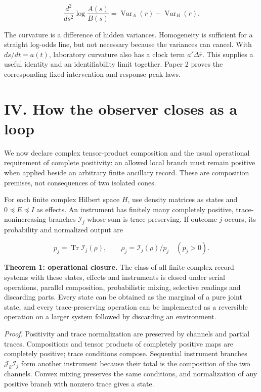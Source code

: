 \documentclass[
  11pt,
  a4paper,
]{article}
\begin{document}
\[\frac{d^2}{ds^2}\log\frac{A(s)}{B(s)}
=\operatorname{Var}_A(r)-\operatorname{Var}_B(r).\]

The curvature is a difference of hidden variances. Homogeneity is sufficient for a straight log-odds line, but not necessary because the variances can cancel. With \(ds/dt=a(t)\), laboratory curvature also has a clock term \(a'\Delta\bar r\). This supplies a useful identity and an identifiability limit together. Paper 2 proves the corresponding fixed-intervention and response-peak laws.

\section{IV. How the observer closes as a loop}\label{iv.-how-the-observer-closes-as-a-loop}

We now declare complex tensor-product composition and the usual operational requirement of complete positivity: an allowed local branch must remain positive when applied beside an arbitrary finite ancillary record. These are composition premises, not consequences of two isolated cones.

For each finite complex Hilbert space \(H\), use density matrices as states and \(0\preceq E\preceq I\) as effects. An instrument has finitely many completely positive, trace-nonincreasing branches \(\mathcal I_j\) whose sum is trace preserving. If outcome \(j\) occurs, its probability and normalized output are

\[p_j=\operatorname{Tr}\mathcal I_j(\rho),\qquad
\rho_j=\mathcal I_j(\rho)/p_j\quad(p_j>0).\]

\textbf{Theorem 1: operational closure.} The class of all finite complex record systems with these states, effects and instruments is closed under serial operations, parallel composition, probabilistic mixing, selective readings and discarding parts. Every state can be obtained as the marginal of a pure joint state, and every trace-preserving operation can be implemented as a reversible operation on a larger system followed by discarding an environment.

\emph{Proof.} Positivity and trace normalization are preserved by channels and partial traces. Compositions and tensor products of completely positive maps are completely positive; trace conditions compose. Sequential instrument branches \(\mathcal J_k\mathcal I_j\) form another instrument because their total is the composition of the two channels. Convex mixing preserves the same conditions, and normalization of any positive branch with nonzero trace gives a state.
\end{document}
